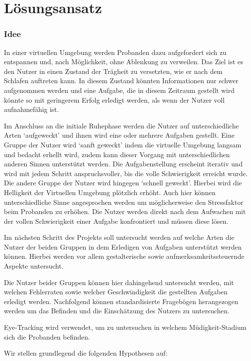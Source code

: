 \chapter{Lösungsansatz}
\subsection{Idee}
In einer virtuellen Umgebung werden Probanden dazu aufgefordert sich zu entspannen und, nach Möglichkeit, ohne Ablenkung zu verweilen. Das Ziel ist es den Nutzer in einen Zustand der Trägheit zu versetzten, wie er nach dem Schlafen auftreten kann. In diesem Zustand könnten Informationen nur schwer aufgenommen werden und eine Aufgabe, die in diesem Zeitraum gestellt wird könnte so mit geringerem Erfolg erledigt werden, als wenn der Nutzer voll aufnahmefähig ist. 

Im Anschluss an die initiale Ruhephase werden die Nutzer auf unterschiedliche Arten `auf\-geweckt' und ihnen wird eine oder mehrere Aufgaben gestellt. Eine Gruppe der Nutzer wird `sanft geweckt' indem die virtuelle Umgebung langsam und bedacht erhellt wird, zudem kann dieser Vorgang mit unterschiedlichen anderen Sinnen unterstützt werden. Die Aufgabenstellung erscheint iterativ und wird mit jedem Schritt anspruchsvoller, bis die volle Schwierigkeit erreicht wurde. 
Die andere Gruppe der Nutzer wird hingegen `schnell geweckt'. Hierbei wird die Helligkeit der Virtuellen Umgebung plötzlich erhöht. Auch hier können unterschiedliche Sinne angesprochen werden um möglicherweise den Stressfaktor beim Probanden zu erhöhen. Die Nutzer werden direkt nach dem Aufwachen mit der vollen Schwierigkeit einer Aufgabe konfrontiert und müssen diese lösen.

Im nächsten Schritt des Projekts soll untersucht werden auf welche Arten die Nutzer der beiden Gruppen in dem Erledigen von Aufgaben unterstützt werden können. Hierbei werden vor allem gestalterische sowie aufmerksamkeitssteuernde Aspekte untersucht. 

Die Nutzer beider Gruppen können hier dahingehend untersucht werden, mit welchen Fehlerraten sowie welcher Geschwindigkeit die gestellten Aufgaben erledigt werden. Nachfolgend können standardisierte Fragebögen herangezogen werden um das Befinden und die Einschätzung des Nutzers zu untersuchen.

Eye-Tracking wird verwendet, um zu untersuchen in welchem Müdigkeit-Stadium sich die Probanden befinden.

Wir stellen grundlegend die folgenden Hypothesen auf:

